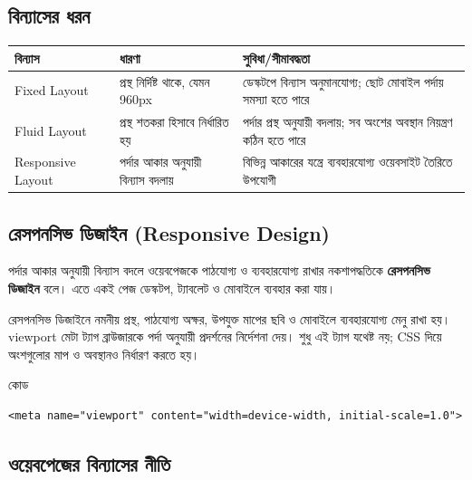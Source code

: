 \subsection{বিন্যাসের ধরন}

\begin{center}
\begin{tabular}{|p{}|p{}|p{}|}
\hline
\textbf{বিন্যাস} & \textbf{ধারণা} & \textbf{সুবিধা/সীমাবদ্ধতা} \\
\hline
Fixed Layout & প্রস্থ নির্দিষ্ট থাকে, যেমন 960px & ডেস্কটপে বিন্যাস অনুমানযোগ্য; ছোট মোবাইল পর্দায় সমস্যা হতে পারে \\
\hline
Fluid Layout & প্রস্থ শতকরা হিসাবে নির্ধারিত হয় & পর্দার প্রস্থ অনুযায়ী বদলায়; সব অংশের অবস্থান নিয়ন্ত্রণ কঠিন হতে পারে \\
\hline
Responsive Layout & পর্দার আকার অনুযায়ী বিন্যাস বদলায় & বিভিন্ন আকারের যন্ত্রে ব্যবহারযোগ্য ওয়েবসাইট তৈরিতে উপযোগী \\
\hline
\end{tabular}
\end{center}

\subsection{রেসপনসিভ ডিজাইন (Responsive Design)}

\begin{definitionbox}{}
পর্দার আকার অনুযায়ী বিন্যাস বদলে ওয়েবপেজকে পাঠযোগ্য ও ব্যবহারযোগ্য রাখার নকশাপদ্ধতিকে \textbf{রেসপনসিভ ডিজাইন} বলে। এতে একই পেজ ডেস্কটপ, ট্যাবলেট ও মোবাইলে ব্যবহার করা যায়।
\end{definitionbox}

রেসপনসিভ ডিজাইনে নমনীয় প্রস্থ, পাঠযোগ্য অক্ষর, উপযুক্ত মাপের ছবি ও মোবাইলে ব্যবহারযোগ্য মেনু রাখা হয়। viewport মেটা ট্যাগ ব্রাউজারকে পর্দা অনুযায়ী প্রদর্শনের নির্দেশনা দেয়। শুধু এই ট্যাগ যথেষ্ট নয়; CSS দিয়ে অংশগুলোর মাপ ও অবস্থানও নির্ধারণ করতে হয়।

\begin{examplebox}{কোড}
\begin{verbatim}
<meta name="viewport" content="width=device-width, initial-scale=1.0">
\end{verbatim}
\end{examplebox}

\subsection{ওয়েবপেজের বিন্যাসের নীতি}

